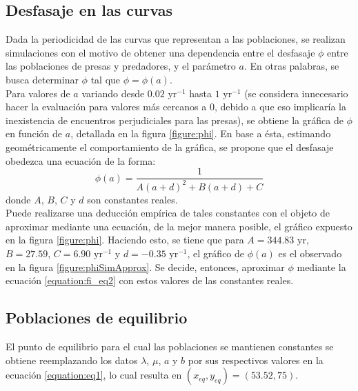 \documentclass[journal, monochrome]{IEEEtran}
\begin{document}
\subsection{Desfasaje en las curvas}

Dada la periodicidad de las curvas que representan a las poblaciones, se realizan simulaciones con el motivo de obtener una dependencia 
entre el desfasaje $\phi$ entre las poblaciones de presas y predadores, y el parámetro $a$. En otras palabras, se busca determinar $\phi$ tal que $\phi = \phi(a)$.\\

Para valores de $a$ variando desde $0.02 \text{ yr}^{-1}$ hasta $1 \text{ yr}^{-1}$ (se considera innecesario hacer la evaluación para valores más cercanos a $0$, debido a que eso implicaría la inexistencia de encuentros 
perjudiciales para las presas), se obtiene la gráfica de $\phi$ en función de $a$, detallada en la figura \ref{figure:phi}.
En base a ésta, estimando geométricamente el comportamiento de la gráfica, se propone que el desfasaje obedezca una ecuación de la forma:
\begin{equation}
\phi(a) = \frac{1}{A (a + d)^2 + B (a + d) + C}
\label{equation:fi_eq2}
\end{equation}
donde $A$, $B$, $C$ y $d$ son constantes reales.\\

Puede realizarse una deducción empírica de tales constantes con el objeto de aproximar mediante una ecuación, de la mejor manera posible, el gráfico expuesto en la figura \ref{figure:phi}. Haciendo esto, se 
tiene que para $A = 344.83 \text{ yr}$, $B = 27.59$, $C = 6.90 \text{ yr}^{-1}$ y $d = -0.35 \text{ yr}^{-1}$, el gráfico de $\phi(a)$ es el observado en la figura \ref{figure:phiSimApprox}.
Se decide, entonces, aproximar $\phi$ mediante la ecuación \ref{equation:fi_eq2} con estos valores de las constantes reales.



\subsection{Poblaciones de equilibrio}

El punto de equilibrio para el cual las poblaciones se mantienen constantes se obtiene reemplazando los datos $\lambda$, $\mu$, $a$ y $b$ por sus respectivos valores en la ecuación \ref{equation:eq1}, 
lo cual resulta en $(x_{eq}, y_{eq}) = (53.52, 75)$. \\
\end{document}
